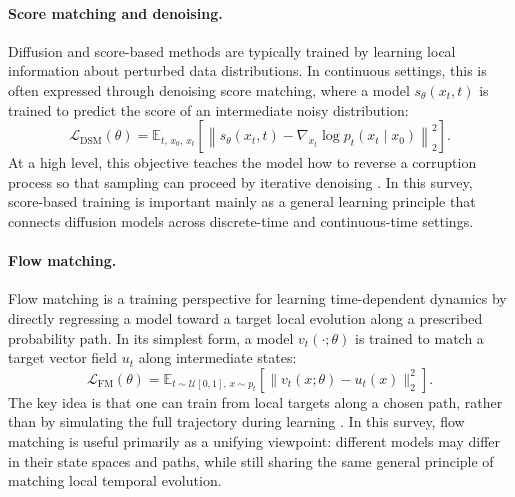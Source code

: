 \documentclass{article}
\begin{document}
\paragraph{Score matching and denoising.}
Diffusion and score-based methods are typically trained by learning local information about perturbed data distributions. In continuous settings, this is often expressed through denoising score matching, where a model $s_\theta(x_t,t)$ is trained to predict the score of an intermediate noisy distribution:
\begin{equation}
\mathcal{L}_{\mathrm{DSM}}(\theta)
=
\mathbb{E}_{t,\,x_0,\,x_t}
\left[
\left\| s_\theta(x_t,t) - \nabla_{x_t}\log p_t(x_t \mid x_0) \right\|_2^2
\right].
\label{eq:prelim_dsm}
\end{equation}
At a high level, this objective teaches the model how to reverse a corruption process so that sampling can proceed by iterative denoising \cite{song2021sde,ho2020denoising}. In this survey, score-based training is important mainly as a general learning principle that connects diffusion models across discrete-time and continuous-time settings.

\paragraph{Flow matching.}
Flow matching is a training perspective for learning time-dependent dynamics by directly regressing a model toward a target local evolution along a prescribed probability path. In its simplest form, a model $v_t(\cdot;\theta)$ is trained to match a target vector field $u_t$ along intermediate states:
\begin{equation}
\mathcal{L}_{\mathrm{FM}}(\theta)
=
\mathbb{E}_{t \sim \mathcal{U}[0,1],\, x \sim p_t}
\left[
\|v_t(x;\theta)-u_t(x)\|_2^2
\right].
\label{eq:prelim_fm}
\end{equation}
The key idea is that one can train from local targets along a chosen path, rather than by simulating the full trajectory during learning \cite{lipman2022flowmatching}. In this survey, flow matching is useful primarily as a unifying viewpoint: different models may differ in their state spaces and paths, while still sharing the same general principle of matching local temporal evolution.
\end{document}
